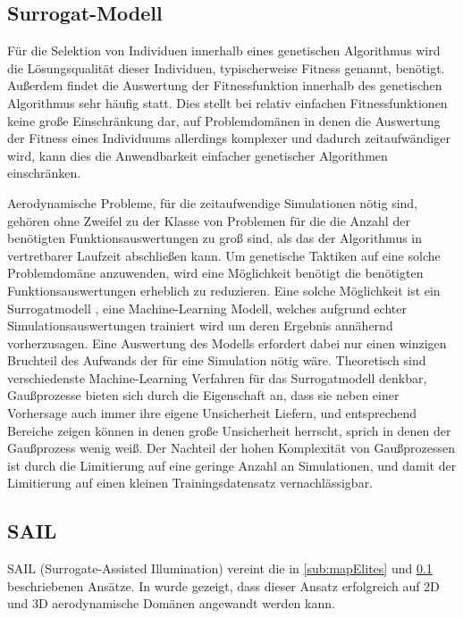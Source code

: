 \documentclass[12pt]{article}
\begin{document}
\subsection{Surrogat-Modell}
\label{sub:surrogate}
Für die Selektion von Individuen innerhalb eines genetischen Algorithmus wird die Lösungsqualität dieser Individuen, typischerweise Fitness genannt, benötigt.
Außerdem findet die Auswertung der Fitnessfunktion innerhalb des genetischen Algorithmus sehr häufig statt.
Dies stellt bei relativ einfachen Fitnessfunktionen keine große Einschränkung dar, auf Problemdomänen in denen die Auswertung der Fitness eines Individuums allerdings komplexer und dadurch zeitaufwändiger wird, kann dies die Anwendbarkeit einfacher genetischer Algorithmen einschränken.

Aerodynamische Probleme, für die zeitaufwendige Simulationen nötig sind, gehören ohne Zweifel zu der Klasse von Problemen für die die Anzahl der benötigten Funktionsauswertungen zu groß sind, als das der Algorithmus in vertretbarer Laufzeit abschließen kann.
Um genetische Taktiken auf eine solche Problemdomäne anzuwenden, wird eine Möglichkeit benötigt die benötigten Funktionsauswertungen erheblich zu reduzieren.
Eine solche Möglichkeit ist ein Surrogatmodell \cite{Jin.2011}\cite{Preen.2016}, eine Machine-Learning Modell, welches aufgrund echter Simulationsauswertungen trainiert wird um deren Ergebnis annähernd vorherzusagen.
Eine Auswertung des Modells erfordert dabei nur einen winzigen Bruchteil des Aufwands der für eine Simulation nötig wäre.
Theoretisch sind verschiedenste Machine-Learning Verfahren für das Surrogatmodell denkbar, Gaußprozesse bieten sich durch die Eigenschaft an, dass sie neben einer Vorhersage auch immer ihre eigene Unsicherheit Liefern, und entsprechend Bereiche zeigen können in denen große Unsicherheit herrscht, sprich in denen der Gaußprozess wenig weiß.
Der Nachteil der hohen Komplexität von Gaußprozessen  ist durch die Limitierung auf eine geringe Anzahl an Simulationen, und damit der Limitierung auf einen kleinen Trainingsdatensatz vernachlässigbar.

\subsection{SAIL}

SAIL (Surrogate-Assisted Illumination) vereint die in \ref{sub:mapElites} und \ref{sub:surrogate} beschriebenen Ansätze.
In \cite{Gaier.6152018} wurde gezeigt, dass dieser Ansatz erfolgreich auf 2D und 3D aerodynamische Domänen angewandt werden kann.
\end{document}
